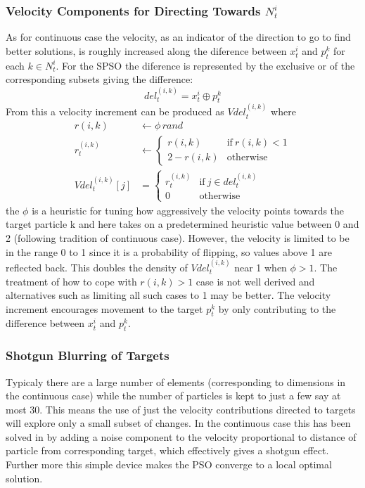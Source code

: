 \documentclass[a4paper,oneside,english]{book}
\numberwithin{equation}{section}
\numberwithin{figure}{section}
\begin{document}
\subsubsection{Velocity Components for Directing Towards $N_t^i$}
As for continuous case the velocity, as an indicator of the direction to go to find better solutions, is roughly increased along the diference between $x_t^i$ and $p_t^k$ for each $k \in  N_t^i$. For the SPSO the diference is represented by the exclusive or of the corresponding subsets giving the difference:
$$del_t^{(i,k)}= x_t^i\oplus p_t^k$$ 
From this a velocity increment can be produced  as $Vdel_t^{(i,k)}$ where  
\begin{align}
\label{randPhi} r(i,k)&\leftarrow\phi\, rand\\
\label{limitPhi}r_t^{(i,k)}&\leftarrow\begin{cases}
r(i,k)& \mathrm{if}\:r(i,k)<1\\
2-r(i,k)& \mathrm{otherwise}
\end{cases}\\
\label{targVel}Vdel_t^{(i,k)}[j]&=\begin{cases}
r_t^{(i,k)}& \mathrm{if}\: j \in del_t^{(i,k)}\\
0 &\mathrm{otherwise}
\end{cases}
\end{align}
the $\phi$ is a heuristic for tuning how aggressively the velocity points towards the  target particle k and here takes on a predetermined heuristic value between 0 and 2 (following tradition of continuous case). However, the velocity is limited to be in the range 0 to 1 since it is a probability of flipping, so values above 1 are reflected back. This doubles the density of $Vdel_t^{(i,k)}$ near 1 when  $\phi > 1$. The treatment of how to cope with $r(i,k) >1$ case is not well derived and  alternatives such as limiting all such cases to 1 may be better. The velocity increment encourages movement to the target $p_t^k$ by only contributing to the difference between $x_t^i$ and  $p_t^k$.
\subsubsection{Shotgun Blurring of Targets }
Typicaly there are a large number of elements (corresponding to dimensions in the continuous case) while the number of particles  is kept to just a few say at most 30. This means the use of just the velocity contributions directed to targets will explore only a small subset of changes. In the continuous case this has been solved in \cite{LcRiPSO} by adding a noise component to the velocity proportional to distance of particle from corresponding target, which effectively gives a shotgun effect. Further more this simple device makes the PSO converge to a local optimal solution.
\end{document}

